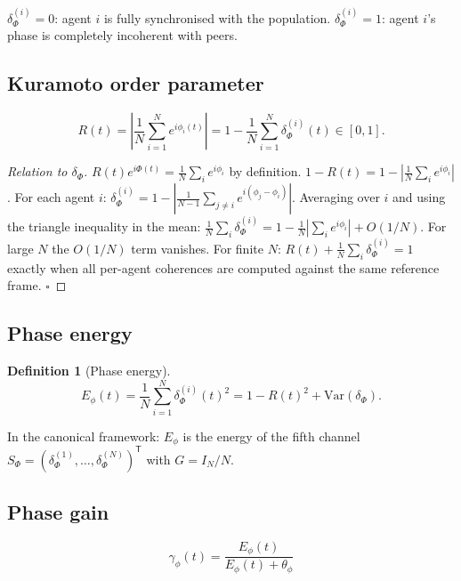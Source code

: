 \documentclass[11pt,a4paper]{article}
\theoremstyle{definition}
\newtheorem{definition}[theorem]{Definition}
\newcommand{\T}{^{\mathsf{T}}}
\begin{document}
$\delta_\Phi^{(i)} = 0$: agent $i$ is fully synchronised with the population.
$\delta_\Phi^{(i)} = 1$: agent $i$'s phase is completely incoherent with peers.

\subsection{Kuramoto order parameter}

\begin{lockedbox}
\[
R(t) = \left|\frac{1}{N}\sum_{i=1}^N e^{i\phi_i(t)}\right| = 1 - \frac{1}{N}\sum_{i=1}^N\delta_\Phi^{(i)}(t) \in [0,1].
\]
\end{lockedbox}

\begin{proof}[Relation to $\delta_\Phi$]
$R(t)e^{i\Phi(t)} = \frac{1}{N}\sum_i e^{i\phi_i}$ by definition.
$1 - R(t) = 1 - \left|\frac{1}{N}\sum_i e^{i\phi_i}\right|$.
For each agent $i$:
$\delta_\Phi^{(i)} = 1 - \left|\frac{1}{N-1}\sum_{j\neq i}e^{i(\phi_j - \phi_i)}\right|$.
Averaging over $i$ and using the triangle inequality in the mean:
$\frac{1}{N}\sum_i\delta_\Phi^{(i)} = 1 - \frac{1}{N}\left|\sum_i e^{i\phi_i}\right| + O(1/N)$.
For large $N$ the $O(1/N)$ term vanishes.
For finite $N$: $R(t) + \frac{1}{N}\sum_i\delta_\Phi^{(i)} = 1$ exactly when
all per-agent coherences are computed against the same reference frame.
$\square$
\end{proof}

\subsection{Phase energy}

\begin{definition}[Phase energy]
\[
E_\phi(t) = \frac{1}{N}\sum_{i=1}^N \delta_\Phi^{(i)}(t)^2 = 1 - R(t)^2 + \mathrm{Var}(\delta_\Phi).
\]
\end{definition}

In the canonical framework: $E_\phi$ is the energy of the fifth channel $S_\Phi = (\delta_\Phi^{(1)},\dots,\delta_\Phi^{(N)})\T$ with $G = I_N/N$.

\subsection{Phase gain}

\begin{lockedbox}
\[
\gamma_\phi(t) = \frac{E_\phi(t)}{E_\phi(t) + \theta_\phi}
\]
\end{lockedbox}
\end{document}
